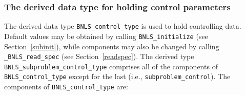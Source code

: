 \documentclass{galahad}
\newcommand{\packagename}{BNLS}
\newcommand{\fullpackagename}{\libraryname\_\packagename}
\begin{document}

\subsubsection{The derived data type for holding control
 parameters}\label{typecontrol}
The derived data type
{\tt \packagename\_control\_type}
is used to hold controlling data. Default values may be obtained by calling
{\tt \packagename\_initialize}
(see Section~\ref{subinit}),
while components may also be changed by calling
{\tt \fullpackagename\_read\-\_spec}
(see Section~\ref{readspec}).
The derived type {\tt \packagename\_subproblem\_control\_type}
comprises all of the components of {\tt \packagename\_control\_type}
except for the last (i.e., {\tt subproblem\_control}).
The components of
{\tt \packagename\_control\_type}
are:
\end{document}
